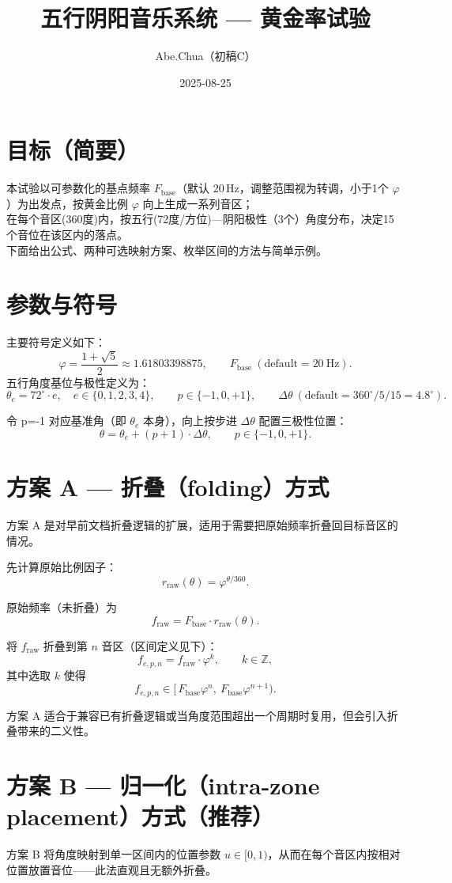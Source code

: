 \documentclass{article}
\title{五行阴阳音乐系统 — 黄金率试验}
\author{Abe.Chua（初稿C）}
\date{2025-08-25}
\begin{document}
\maketitle

\section*{目标（简要）}
本试验以可参数化的基点频率 \(F_{\mathrm{base}}\)（默认 20\,Hz，调整范围视为转调，小于1个 \(\varphi\)）为出发点，按黄金比例 \(\varphi\) 向上生成一系列音区；
\\在每个音区(360度)内，按五行(72度/方位)—阴阳极性（3个）角度分布，决定15个音位在该区内的落点。
\\下面给出公式、两种可选映射方案、枚举区间的方法与简单示例。

\section*{参数与符号}
主要符号定义如下：
\[
\varphi=\frac{1+\sqrt5}{2}\approx1.61803398875,\qquad F_{\mathrm{base}}\ (\text{default}=20\ \mathrm{Hz}).
\]
五行角度基位与极性定义为：
\[
\theta_e = 72^\circ\cdot e,\quad e\in\{0,1,2,3,4\},\qquad p\in\{-1,0,+1\},\qquad \Delta\theta\ (\text{default}=360^\circ/5/15=4.8^\circ).
\]

令 p=-1 对应基准角（即 \(\theta_e\) 本身），向上按步进 \(\Delta\theta\) 配置三极性位置：
\[
\theta=\theta_e + (p+1)\cdot\Delta\theta,\qquad p\in\{-1,0,+1\}.
\]

\section*{方案 A — 折叠（folding）方式}
方案 A 是对早前文档折叠逻辑的扩展，适用于需要把原始频率折叠回目标音区的情况。

先计算原始比例因子：
\[
r_{\mathrm{raw}}(\theta)=\varphi^{\theta/360}.
\]

原始频率（未折叠）为
\[
f_{\mathrm{raw}} = F_{\mathrm{base}}\cdot r_{\mathrm{raw}}(\theta).
\]

将 \(f_{\mathrm{raw}}\) 折叠到第 \(n\) 音区（区间定义见下）：
\[
f_{e,p,n} = f_{\mathrm{raw}}\cdot\varphi^{k},\qquad k\in\mathbb{Z},
\]
其中选取 \(k\) 使得
\[
f_{e,p,n}\in[\,F_{\mathrm{base}}\varphi^{n},\ F_{\mathrm{base}}\varphi^{n+1}).
\]

方案 A 适合于兼容已有折叠逻辑或当角度范围超出一个周期时复用，但会引入折叠带来的二义性。

\section*{方案 B — 归一化（intra-zone placement）方式（推荐）}
方案 B 将角度映射到单一区间内的位置参数 \(u\in[0,1)\)，从而在每个音区内按相对位置放置音位——此法直观且无额外折叠。
\end{document}
